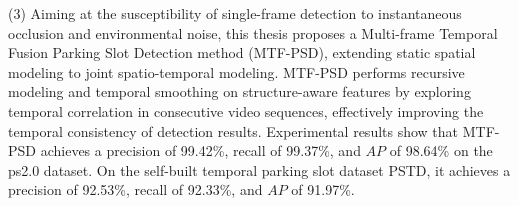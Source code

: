 \begin{englishabstract}
(3) Aiming at the susceptibility of single-frame detection to instantaneous occlusion and environmental noise, this thesis proposes a Multi-frame Temporal Fusion Parking Slot Detection method (MTF-PSD), extending static spatial modeling to joint spatio-temporal modeling. MTF-PSD performs recursive modeling and temporal smoothing on structure-aware features by exploring temporal correlation in consecutive video sequences, effectively improving the temporal consistency of detection results. Experimental results show that MTF-PSD achieves a precision of 99.42\%, recall of 99.37\%, and $AP$ of 98.64\% on the ps2.0 dataset. On the self-built temporal parking slot dataset PSTD, it achieves a precision of 92.53\%, recall of 92.33\%, and $AP$ of 91.97\%.
	
	\noindent{}
\end{englishabstract}